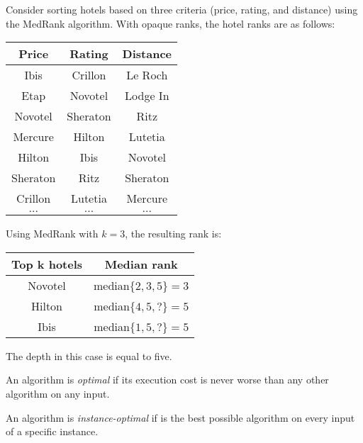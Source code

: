 \begin{example}
    Consider sorting hotels based on three criteria (price, rating, and distance) using the MedRank algorithm. 
    With opaque ranks, the hotel ranks are as follows:
    \begin{table}[H]
        \centering
        \begin{tabular}{c|c|c}
        \textbf{Price} & \textbf{Rating} & \textbf{Distance} \\ \hline
        Ibis           & Crillon         & Le Roch           \\
        Etap           & Novotel         & Lodge In          \\
        Novotel        & Sheraton        & Ritz              \\
        Mercure        & Hilton          & Lutetia           \\
        Hilton         & Ibis            & Novotel           \\
        Sheraton       & Ritz            & Sheraton          \\
        Crillon        & Lutetia         & Mercure           \\
        $\dots$        & $\dots$         & $\dots$          
        \end{tabular}
    \end{table}
    Using MedRank with $k=3$, the resulting rank is:
    \begin{table}[H]
        \centering
        \begin{tabular}{cc}
        \hline
        \textbf{Top k hotels}       & \textbf{Median rank}          \\ \hline
        Novotel                     & median$\{2,3,5\}=3$           \\ 
        Hilton                      & median$\{4,5,?\}=5$           \\ 
        Ibis                        & median$\{1,5,?\}=5$           \\ \hline
        \end{tabular}
    \end{table}
    The depth in this case is equal to five.
\end{example}
\begin{definition}
    An algorithm is \emph{optimal} if its execution cost is never worse than any other algorithm on any input.

    An algorithm is \emph{instance-optimal} if is the best possible algorithm on every input of a specific instance. 
\end{definition}
